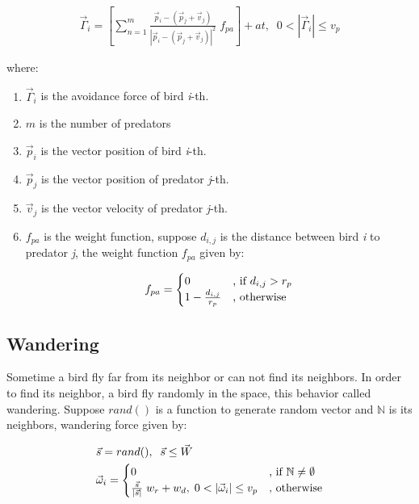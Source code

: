 \documentclass[journal,transmag]{IEEEtran}
\begin{document}
\begin{enumerate}[-]
\begin{align}
\vec{\Gamma}_i = \left[\sum_{n=1}^m{\frac{\vec{p}_i - (\vec{p}_j+\vec{v}_j)}{|\vec{p}_i - (\vec{p}_j+\vec{v}_j)|^2}} \;f_{pa}\right] + at, \;\;0 < |\vec{\Gamma}_i| \leq v_p
\end{align}

where:

\begin{enumerate}
\item \(\vec{\Gamma}_i\) is the avoidance force of bird \emph{i}-th.
\item \(m\) is the number of predators 
\item \(\vec{p}_i\) is the vector position of bird \emph{i}-th.
\item \(\vec{p}_j\) is the vector position of predator \emph{j}-th.
\item \(\vec{v}_j\) is the vector velocity of predator \emph{j}-th.
\item \(f_{pa}\) is the weight function, suppose \(d_{i,j}\) is the distance between bird \emph{i} to predator \emph{j}, the weight function \(f_{pa}\) given by:

\begin{equation*}
	f_{pa} = \begin{cases}
	0 &\text{, if $ d_{i,j} > r_p$}\\
	1 - \frac{d_{i,j}}{r_p} &\text{, otherwise}
	\end{cases}
\end{equation*}
\end{enumerate}
\end{enumerate}

\subsection{Wandering}
Sometime a bird fly far from its neighbor or can not find its neighbors. In order to find its neighbor, a bird fly randomly in the space, this behavior called wandering. Suppose \(rand()\) is a function to generate random vector and \(\mathbb{N}\) is its neighbors, wandering force given by:

\begin{align}
&\vec{s} = rand(), \;\;\vec{s} \leq \vec{W}\\
&\vec{\omega}_i = \begin{cases}
		0 &\text{, if $ \mathbb{N} \neq \emptyset$}\\
		\frac{\vec{s}}{|\vec{s}|}\;w_r+w_d,\; 0 < |\vec{\omega}_i| \leq v_p &\text{, otherwise}
	\end{cases}
\end{align}
\end{document}
